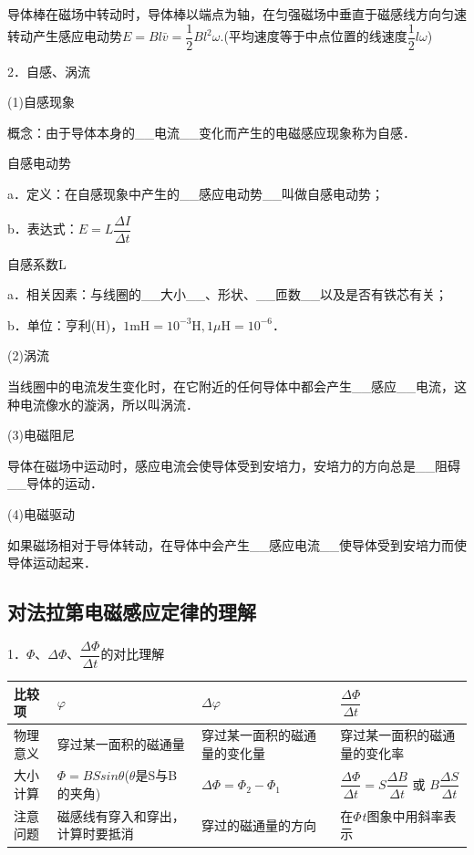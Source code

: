 \documentclass[cn,10.5pt,chinese,mac,chinesefont=founder]{elegantbook}
\begin{document}
导体棒在磁场中转动时，导体棒以端点为轴，在匀强磁场中垂直于磁感线方向匀速转动产生感应电动势$E=B l \bar{v}=\dfrac{1}{2}Bl^2\omega$.(平均速度等于中点位置的线速度$\dfrac{1}{2} l \omega$)

2．自感、涡流

(1)自感现象

概念：由于导体本身的\_\_电流\_\_变化而产生的电磁感应现象称为自感．

自感电动势

a．定义：在自感现象中产生的\_\_感应电动势\_\_叫做自感电动势；

b．表达式：$E=L \dfrac{\Delta I}{\Delta t}$

自感系数L

a．相关因素：与线圈的\_\_大小\_\_、形状、\_\_匝数\_\_以及是否有铁芯有关；

b．单位：亨利(H)，$1 \mathrm{mH}=10^{-3} \mathrm{H}, 1 \mu \mathrm{H}=10^{-6}$．

(2)涡流

当线圈中的电流发生变化时，在它附近的任何导体中都会产生\_\_感应\_\_电流，这种电流像水的漩涡，所以叫涡流．

(3)电磁阻尼

导体在磁场中运动时，感应电流会使导体受到安培力，安培力的方向总是\_\_阻碍\_\_导体的运动．

(4)电磁驱动

如果磁场相对于导体转动，在导体中会产生\_\_感应电流\_\_使导体受到安培力而使导体运动起来．
\newpage
\subsection{对法拉第电磁感应定律的理解}

1．$\Phi$、$\Delta \Phi$、$\dfrac{\Delta \Phi}{\Delta t}$的对比理解

\begin{longtable}[]{@{}m{1.5cm}m{3.7cm}m{3.2cm}m{3.7cm}@{}}
\toprule
比较项 & $\varphi$ & $\Delta \varphi$ &$\dfrac{\Delta \Phi}{\Delta t}$\tabularnewline
\midrule
\endhead
物理意义 & 穿过某一面积的磁通量 & 穿过某一面积的磁通量的变化量 &
穿过某一面积的磁通量的变化率\tabularnewline
大小计算 & $\Phi=BSsin \theta$($\theta$是S与B的夹角) & $\Delta \Phi=\Phi_2-\Phi_1 $&
$\dfrac{\Delta \Phi}{\Delta t}=S \dfrac{\Delta B}{\Delta t}$ 或 $B \dfrac{\Delta S}{\Delta t}$\tabularnewline
注意问题 & 磁感线有穿入和穿出，计算时要抵消 & 穿过的磁通量的方向 &
在$\Phi_­t$图象中用斜率表示\tabularnewline
\bottomrule
\end{longtable}
\end{document}
